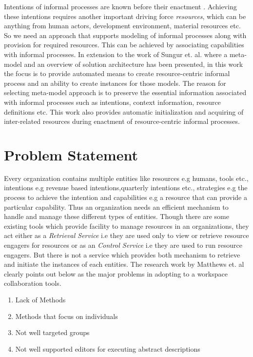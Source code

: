 Intentions of informal processes are known before their enactment \cite{Sungur2015}. Achieving these intentions requires another important driving force \textit{resources}, which can be anything from human actors, development environment, material resources etc. So we need an approach that supports modeling of informal processes along with provision for required resources. This can be achieved by associating capabilities with informal processes. In extension to the work of Sungur et. al. \cite{Sungur2014a} where a meta-model and an overview of solution architecture has been presented,  in this work the focus is to provide automated means to create resource-centric informal process and an ability to create instances for those models. The reason for selecting meta-model approach is to preserve the essential information associated with informal processes such as intentions, context information, resource definitions etc.  This work also provides automatic initialization and acquiring of inter-related resources during enactment of resource-centric informal processes.



\section{Problem Statement}
\label{sec:problemstatement}
 Every organization contains multiple entities like resources e.g humans, tools etc., intentions e.g revenue based intentions,quarterly intentions etc., strategies e.g the process to achieve the intention and capabilities e.g a resource that can provide a particular capability. Thus an organization needs an efficient mechanism to handle and manage these different types of entities. Though there are some existing tools which provide facility to manage resources in an organizations, they act either as a \textit{Retrieval Service} i.e they are used only to view or retrieve resource engagers for resources or as an \textit{Control Service} i.e they are used to run resource engagers. But there is not a service which provides both mechanism to retrieve and initiate the instances of each entities. The research work by Matthews et. al \cite{Matthews2011}  clearly points out below as the major problems in adopting to a workspace collaboration tools.

\begin{enumerate}
	\item Lack of Methods
	\item Methods that focus on individuals
	\item Not well targeted groups
	\item Not well supported editors for executing abstract descriptions
\end{enumerate}

